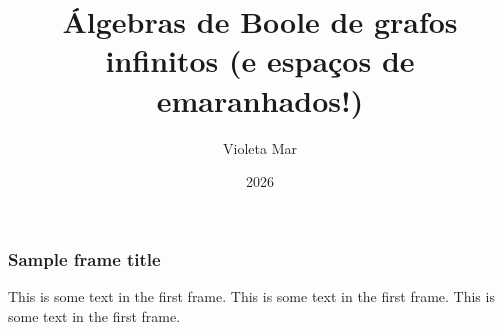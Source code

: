 \documentclass{beamer}
\title{Álgebras de Boole de grafos infinitos (e espaços de emaranhados!)}
\author{Violeta Mar}
\institute{ICMC}
\date{2026}
\begin{document}
\frame{\titlepage}

\begin{frame}
\frametitle{Sample frame title}
This is some text in the first frame. This is some text in the first frame. This is some text in the first frame.
\end{frame}
\end{document}
